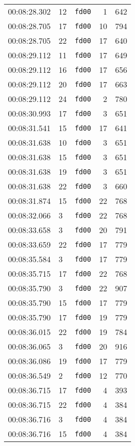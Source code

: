\documentclass{article}
\begin{document}
\begin{longtable}{lllrr}
00:08:28.302 & 12 & \texttt{fd00} & 1 & 642 \\
00:08:28.705 & 17 & \texttt{fd00} & 10 & 794 \\
00:08:28.705 & 22 & \texttt{fd00} & 17 & 640 \\
00:08:29.112 & 11 & \texttt{fd00} & 17 & 649 \\
00:08:29.112 & 16 & \texttt{fd00} & 17 & 656 \\
00:08:29.112 & 20 & \texttt{fd00} & 17 & 663 \\
00:08:29.112 & 24 & \texttt{fd00} & 2 & 780 \\
00:08:30.993 & 17 & \texttt{fd00} & 3 & 651 \\
00:08:31.541 & 15 & \texttt{fd00} & 17 & 641 \\
00:08:31.638 & 10 & \texttt{fd00} & 3 & 651 \\
00:08:31.638 & 15 & \texttt{fd00} & 3 & 651 \\
00:08:31.638 & 19 & \texttt{fd00} & 3 & 651 \\
00:08:31.638 & 22 & \texttt{fd00} & 3 & 660 \\
00:08:31.874 & 15 & \texttt{fd00} & 22 & 768 \\
00:08:32.066 & 3 & \texttt{fd00} & 22 & 768 \\
00:08:33.658 & 3 & \texttt{fd00} & 20 & 791 \\
00:08:33.659 & 22 & \texttt{fd00} & 17 & 779 \\
00:08:35.584 & 3 & \texttt{fd00} & 17 & 779 \\
00:08:35.715 & 17 & \texttt{fd00} & 22 & 768 \\
00:08:35.790 & 3 & \texttt{fd00} & 22 & 907 \\
00:08:35.790 & 15 & \texttt{fd00} & 17 & 779 \\
00:08:35.790 & 17 & \texttt{fd00} & 19 & 779 \\
00:08:36.015 & 22 & \texttt{fd00} & 19 & 784 \\
00:08:36.065 & 3 & \texttt{fd00} & 20 & 916 \\
00:08:36.086 & 19 & \texttt{fd00} & 17 & 779 \\
00:08:36.549 & 2 & \texttt{fd00} & 12 & 770 \\
00:08:36.715 & 17 & \texttt{fd00} & 4 & 393 \\
00:08:36.715 & 22 & \texttt{fd00} & 4 & 384 \\
00:08:36.716 & 3 & \texttt{fd00} & 4 & 384 \\
00:08:36.716 & 15 & \texttt{fd00} & 4 & 384 \\

\end{longtable}
\end{document}
